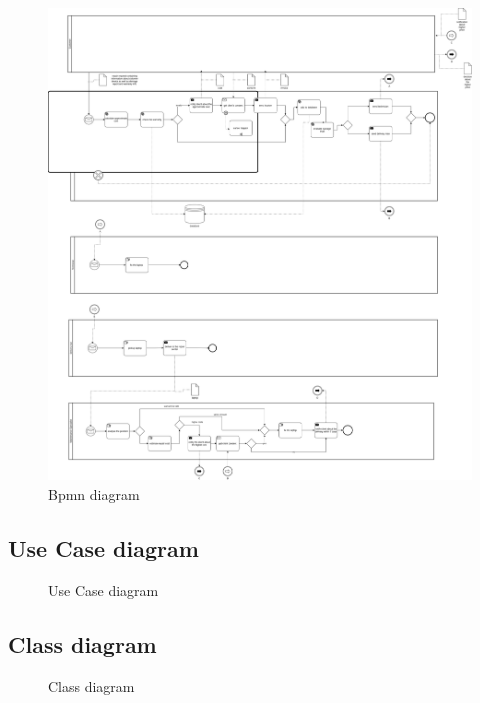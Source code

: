 \documentclass[12pt]{article}
\begin{document}
  \FloatBarrier
  \begin{figure}[!htbp]
    \centering
    \includegraphics[width=1\textwidth]{bpmn_optimized.png}
    \caption{Bpmn diagram}
  \end{figure}
  \FloatBarrier

  \subsection{Use Case diagram}
  \FloatBarrier
  \begin{figure}[!htbp]
    \centering
    \def\svgwidth{\columnwidth}
    
    \caption{Use Case diagram}
  \end{figure}
  \FloatBarrier

  \subsection{Class diagram}
  \FloatBarrier
  \begin{figure}[!htbp]
    \centering
    \def\svgwidth{\columnwidth}
    
    \caption{Class diagram}
  \end{figure}
  \FloatBarrier
\end{document}
